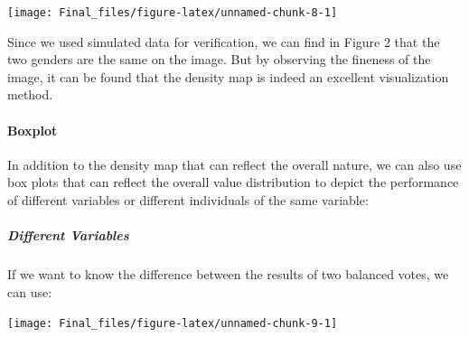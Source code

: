 \documentclass[
]{article}
\newenvironment{Shaded}{\begin{snugshade}}{\end{snugshade}}
\newcommand{\DataTypeTok}[1]{\textcolor[rgb]{0.13,0.29,0.53}{#1}}
\newcommand{\FloatTok}[1]{\textcolor[rgb]{0.00,0.00,0.81}{#1}}
\newcommand{\KeywordTok}[1]{\textcolor[rgb]{0.13,0.29,0.53}{\textbf{#1}}}
\newcommand{\NormalTok}[1]{#1}
\newcommand{\OperatorTok}[1]{\textcolor[rgb]{0.81,0.36,0.00}{\textbf{#1}}}
\newcommand{\StringTok}[1]{\textcolor[rgb]{0.31,0.60,0.02}{#1}}
\begin{document}
\begin{center}\texttt{[image: Final\_files/figure-latex/unnamed-chunk-8-1]} \end{center}

Since we used simulated data for verification, we can find in Figure 2
that the two genders are the same on the image. But by observing the
fineness of the image, it can be found that the density map is indeed an
excellent visualization method.

\hypertarget{boxplot}{%
\paragraph{Boxplot}\label{boxplot}}

In addition to the density map that can reflect the overall nature, we
can also use box plots that can reflect the overall value distribution
to depict the performance of different variables or different
individuals of the same variable:

\hypertarget{different-variables}{%
\subparagraph{Different Variables}\label{different-variables}}

If we want to know the difference between the results of two balanced
votes, we can use:

\begin{Shaded}
\end{Shaded}

\begin{center}\texttt{[image: Final\_files/figure-latex/unnamed-chunk-9-1]} \end{center}
\end{document}
